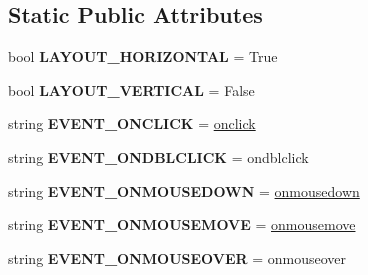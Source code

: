 \subsection*{Static Public Attributes}
\begin{DoxyCompactItemize}
\item 
bool {\bfseries L\+A\+Y\+O\+U\+T\+\_\+\+H\+O\+R\+I\+Z\+O\+N\+T\+AL} = True\hypertarget{classremi_1_1gui_1_1Widget_a0d181646194fba0e126d9a5d719847f8}{}\label{classremi_1_1gui_1_1Widget_a0d181646194fba0e126d9a5d719847f8}

\item 
bool {\bfseries L\+A\+Y\+O\+U\+T\+\_\+\+V\+E\+R\+T\+I\+C\+AL} = False\hypertarget{classremi_1_1gui_1_1Widget_aaa1e66c13ee0e1f4740107305521e0a8}{}\label{classremi_1_1gui_1_1Widget_aaa1e66c13ee0e1f4740107305521e0a8}

\item 
string {\bfseries E\+V\+E\+N\+T\+\_\+\+O\+N\+C\+L\+I\+CK} = \textquotesingle{}\hyperlink{classremi_1_1gui_1_1Widget_ad036cd96fa5abd6055fa875fa150f08c}{onclick}\textquotesingle{}\hypertarget{classremi_1_1gui_1_1Widget_a9443021e1124e523d2217f50f76ff2c7}{}\label{classremi_1_1gui_1_1Widget_a9443021e1124e523d2217f50f76ff2c7}

\item 
string {\bfseries E\+V\+E\+N\+T\+\_\+\+O\+N\+D\+B\+L\+C\+L\+I\+CK} = \textquotesingle{}ondblclick\textquotesingle{}\hypertarget{classremi_1_1gui_1_1Widget_ace3abc373b63a2257c704a613675e2ed}{}\label{classremi_1_1gui_1_1Widget_ace3abc373b63a2257c704a613675e2ed}

\item 
string {\bfseries E\+V\+E\+N\+T\+\_\+\+O\+N\+M\+O\+U\+S\+E\+D\+O\+WN} = \textquotesingle{}\hyperlink{classremi_1_1gui_1_1Widget_a6fb4528091d3ecc9c92afe12aabd3735}{onmousedown}\textquotesingle{}\hypertarget{classremi_1_1gui_1_1Widget_accc28afb3f9a1f73837923f45c83be0b}{}\label{classremi_1_1gui_1_1Widget_accc28afb3f9a1f73837923f45c83be0b}

\item 
string {\bfseries E\+V\+E\+N\+T\+\_\+\+O\+N\+M\+O\+U\+S\+E\+M\+O\+VE} = \textquotesingle{}\hyperlink{classremi_1_1gui_1_1Widget_adf1c0cfa83a0e76f4f05486dfb0873d6}{onmousemove}\textquotesingle{}\hypertarget{classremi_1_1gui_1_1Widget_aa68a43bed8c3fbd928a958c78e83163d}{}\label{classremi_1_1gui_1_1Widget_aa68a43bed8c3fbd928a958c78e83163d}

\item 
string {\bfseries E\+V\+E\+N\+T\+\_\+\+O\+N\+M\+O\+U\+S\+E\+O\+V\+ER} = \textquotesingle{}onmouseover\textquotesingle{}\hypertarget{classremi_1_1gui_1_1Widget_a76f86dae35441d76aaaa6f1c109fba9c}{}\label{classremi_1_1gui_1_1Widget_a76f86dae35441d76aaaa6f1c109fba9c}


\end{DoxyCompactItemize}
